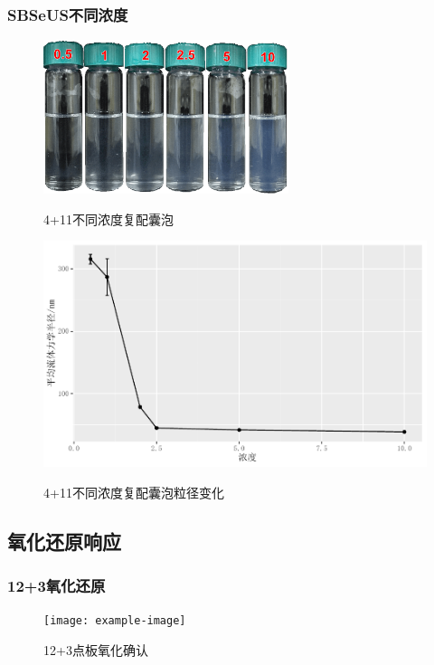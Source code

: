 \documentclass[bachelor,fandolfonts,replaceperiod]{jnuthesis}
\begin{document}
    \subsubsection{SBSeUS不同浓度}
    \begin{figure}[htbp]
        \centering
        \includegraphics[height=4.5cm]{figure/SDSePS-concentration.png}\\
        \caption{4+11不同浓度复配囊泡}\label{fig:vesicle-SBSeUS-concentration}
    \end{figure}
    
    \begin{figure}[htbp]
        \centering
        \includegraphics[width=.65\textwidth]{Figure/test.pdf}\\
        \caption{4+11不同浓度复配囊泡粒径变化}\label{fig:vesicle-SBSeUS-concentration-line}
    \end{figure}

    \subsection{氧化还原响应}
    \subsubsection{12+3氧化还原}
    \begin{figure}[htbp]
        \centering
        \texttt{[image: example-image]}\\
        \caption{12+3点板氧化确认}\label{fig:}
    \end{figure}
    
\end{document}
